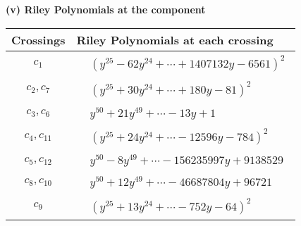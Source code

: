 \documentclass[1p]{elsarticle_modified}
\theoremstyle{definition}
\begin{document}
\newpage\renewcommand{\arraystretch}{1}
\flushleft \textbf{(v) Riley Polynomials at the component}\newline \\
\begin{tabular}{m{50pt}|m{274pt}}
Crossings & \hspace{64pt}Riley Polynomials at each crossing \\
\hline $$\begin{aligned}c_{1}\end{aligned}$$&$\begin{aligned}
&(y^{25}-62 y^{24}+\cdots+1407132 y-6561)^{2}
\end{aligned}$\\
\hline $$\begin{aligned}c_{2},c_{7}\end{aligned}$$&$\begin{aligned}
&(y^{25}+30 y^{24}+\cdots+180 y-81)^{2}
\end{aligned}$\\
\hline $$\begin{aligned}c_{3},c_{6}\end{aligned}$$&$\begin{aligned}
&y^{50}+21 y^{49}+\cdots-13 y+1
\end{aligned}$\\
\hline $$\begin{aligned}c_{4},c_{11}\end{aligned}$$&$\begin{aligned}
&(y^{25}+24 y^{24}+\cdots-12596 y-784)^{2}
\end{aligned}$\\
\hline $$\begin{aligned}c_{5},c_{12}\end{aligned}$$&$\begin{aligned}
&y^{50}-8 y^{49}+\cdots-156235997 y+9138529
\end{aligned}$\\
\hline $$\begin{aligned}c_{8},c_{10}\end{aligned}$$&$\begin{aligned}
&y^{50}+12 y^{49}+\cdots-46687804 y+96721
\end{aligned}$\\
\hline $$\begin{aligned}c_{9}\end{aligned}$$&$\begin{aligned}
&(y^{25}+13 y^{24}+\cdots-752 y-64)^{2}
\end{aligned}$\\
\hline
\end{tabular}\\~\\
\end{document}
